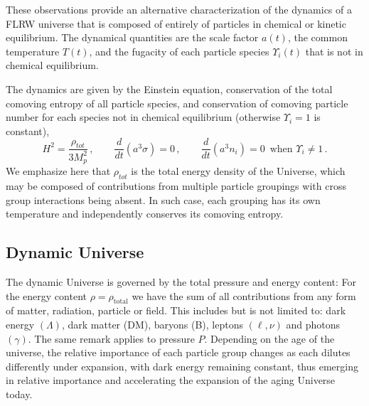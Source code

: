 These observations provide an alternative characterization of the dynamics of a FLRW universe that is composed of entirely of particles in chemical or kinetic equilibrium. The dynamical quantities are the scale factor $a(t)$, the common temperature $T(t)$, and the fugacity of each particle species $\Upsilon_i(t)$ that is not in chemical equilibrium. 

The dynamics are given by the Einstein equation, conservation of the total comoving entropy of all particle species, and conservation of comoving particle number for each species not in chemical equilibrium (otherwise $\Upsilon_i=1$ is constant),
\begin{equation}\label{eq_dynamics}
H^2=\frac{\rho_{tot}}{3M_p^2}\,, \qquad \frac{d}{dt}(a^3\sigma )=0\,,\qquad \frac{d}{dt}(a^3n_i)=0 \,\text{ when } \Upsilon_i\neq 1\,.
\end{equation}
We emphasize here that $\rho_{tot}$ is the total energy density of the Universe, which may be composed of contributions from multiple particle groupings with cross group interactions being absent. In such case, each grouping has its own temperature and independently conserves its comoving entropy. 
%

\subsection{Dynamic Universe}\label{sec:dynamic}
The dynamic Universe is governed by the total pressure and energy content: For the energy content $\rho=\rho_\mathrm{total}$ we have the sum of all contributions from any form of matter, radiation, particle or field. This includes but is not limited to: dark energy $(\Lambda)$, dark matter (DM), baryons (B), leptons $(\ell,\nu)$ and photons $(\gamma)$. The same remark applies to pressure $P$. Depending on the age of the universe, the relative importance of each particle group changes as each dilutes differently under expansion, with dark energy remaining constant, thus emerging in relative importance and accelerating the expansion of the aging Universe today. 

